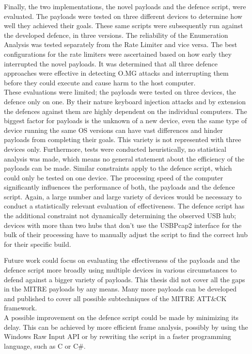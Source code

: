 Finally, the two implementations, the novel payloads and the defence script, were evaluated. The payloads were tested on three different devices to determine how well they achieved their goals. These same scripts were subsequently run against the developed defence, in three versions. The reliability of the Enumeration Analysis was tested separately from the Rate Limiter and vice versa. The best configurations for the rate limiters were ascertained based on how early they interrupted the novel payloads. It was determined that all three defence approaches were effective in detecting O.MG attacks and interrupting them before they could execute and cause harm to the host computer. \\

These evaluations were limited; the payloads were tested on three devices, the defence only on one. By their nature keyboard injection attacks and by extension the defences against them are highly dependent on the individual computers. The biggest factor for payloads is the unknown of a new device, even the same type of device running the same OS versions can have vast differences and hinder payloads from completing their goals. This variety is not represented with three devices only. Furthermore, tests were conducted heuristically, no statistical analysis was made, which means no general statement about the efficiency of the payloads can be made. Similar constraints apply to the defence script, which could only be tested on one device. The processing speed of the computer significantly influences the performance of both, the payloads and the defence script. Again, a large number and large variety of devices would be necessary to conduct a statistically relevant evaluation of effectiveness. The defence script has the additional constraint not dynamically determining the observed USB hub; devices with more than two hubs that don't use the USBPcap2 interface for the bulk of their processing have to manually adjust the script to find the correct hub for their specific build. 

Future work could focus on evaluating the effectiveness of the payloads and the defence script more broadly using multiple devices in various circumstances to defend against a bigger variety of payloads. This thesis did not cover all the gaps in the MITRE payloads by any means. Many more payloads can be developed and published to cover all possible subtechniques of the MITRE ATT\&CK framework. \\
A possible improvement on the defence script could be made by minimizing its delay. This can be achieved by more efficient frame analysis, possibly by using the Windows Raw Input API or by rewriting the script in a faster programming language, such as C or C\#.







